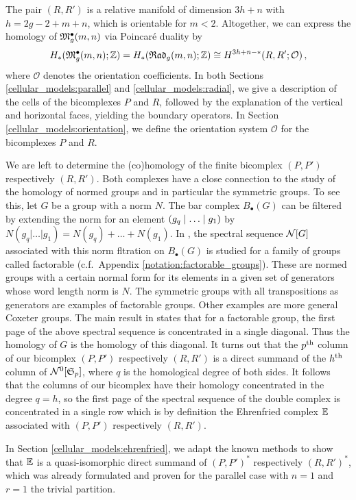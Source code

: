 The pair $(R, R')$ is a relative manifold of dimension $3h + n$ with $h = 2g - 2 + m + n$, which is orientable for $m < 2$.
Altogether, we can express the homology of $\mathfrak{M}^\bullet_g(m, n)$ via Poincaré duality by
\[
    H_\ast( \mathfrak{M}^\bullet_g(m, n); \mathbb Z ) = H_\ast( {\mathfrak{Rad}_g(m,n)}; \mathbb Z ) \cong H^{3h+n-\ast}( R, R'; \mathcal O)\,,
\]
where $\mathcal O$ denotes the orientation coefficients.
In both Sections \ref{cellular_models:parallel} and \ref{cellular_models:radial}, we give a description of the cells of the bicomplexes $P$ and $R$,
followed by the explanation of the vertical and horizontal faces, yielding the boundary operators.
In Section \ref{cellular_models:orientation}, we define the orientation system $\mathcal O$ for the bicomplexes $P$ and $R$.

We are left to determine the (co)homology of the finite bicomplex $(P,P')$ respectively $(R,R')$.
Both complexes have a close connection to the study of the homology of normed groups and in particular the symmetric groups.
To see this, let $G$ be a group with a norm $N$.
The bar complex $B_\bullet(G)$ can be filtered by extending the norm for an element $\inhomq[g]$ by
$N(g_q | \ldots | g_1) = N(g_q) + \ldots + N(g_1)$.
In \cite{Visy201011}, the spectral sequence $\mathcal{N}[G]$ associated with this norm fltration on $B_\bullet(G)$ is studied for a family of groups called factorable (c.f.\ Appendix \ref{notation:factorable_groups}).
These are normed groups with a certain normal form for its elements in a given set of generators whose word length norm is $N$.
The symmetric groups with all transpositions as generators are examples of factorable groups.
Other examples are more general Coxeter groups.
The main result in \cite{Visy201011} states that for a factorable group, the first page of the above spectral sequence is concentrated in a single diagonal.
Thus the homology of $G$ is the homology of this diagonal.
It turns out that the $p^{\text{th}}$ column of our bicomplex $(P,P')$ respectively $(R,R')$ is a direct summand of the $h^{\text{th}}$ column of $\mathcal{N}^0[\mathfrak S_p]$,
where $q$ is the homological degree of both sides.
It follows that the columns of our bicomplex have their homology concentrated in the degree $q=h$,
so the first page of the spectral sequence of the double complex is concentrated in a single row which is by definition the Ehrenfried complex $\mathbb E$ associated with $(P,P')$ respectively $(R,R')$.

In Section \ref{cellular_models:ehrenfried}, we adapt the known methods to show that $\mathbb E$ is a quasi-isomorphic direct summand of $(P,P')^\ast$ respectively $(R,R')^\ast$,
which was already formulated and proven for the parallel case with $n=1$ and $r=1$ the trivial partition.

